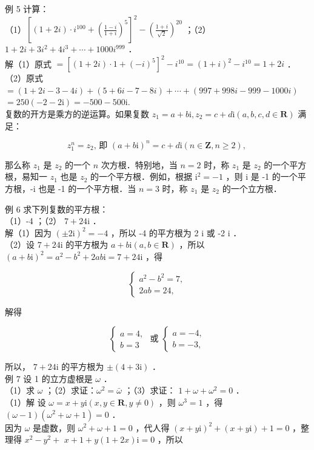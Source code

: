 \documentclass[10pt]{article}
\begin{document}
例 5 计算：\\
（1）\(\left[(1+2 i) \cdot i^{100}+\left(\frac{1-i}{1+i}\right)^{5}\right]^{2}-\left(\frac{1+i}{\sqrt{2}}\right)^{20}\) ；（2） \(1+2 i+3 i^{2}+4 i^{3}+\cdots+1000 i^{999}\) ．\\
解（1）原式 \(=\left[(1+2 i) \cdot 1+(-i)^{5}\right]^{2}-i^{10}=(1+i)^{2}-i^{10}=1+2 i\) ．\\
（2）原式 \(=(1+2 i-3-4 i)+(5+6 i-7-8 i)+\cdots+(997+998 i-999-1000 i)\) \(=250(-2-2 \mathrm{i})=-500-500 \mathrm{i}\).\\
复数的开方是乘方的逆运算。如果复数 \(z_{1}=a+b \mathrm{i}, z_{2}=c+d \mathrm{i}(a, b, c, d \in \mathbf{R})\) 满足：

\[
z_{1}^{n}=z_{2} \text {, 即 }(a+b \mathrm{i})^{n}=c+d \mathrm{i}(n \in \mathbf{Z}, n \geqslant 2) \text {, }
\]

那么称 \(z_{1}\) 是 \(z_{2}\) 的一个 \(n\) 次方根．特别地，当 \(n=2\) 时，称 \(z_{1}\) 是 \(z_{2}\) 的一个平方根，易知一 \(z_{1}\) 也是 \(z_{2}\) 的一个平方根．例如，根据 \(\mathrm{i}^{2}=-1\) ，则 i 是 -1 的一个平方根，-i 也是 -1 的一个平方根．当 \(n=3\) 时，称 \(z_{1}\) 是 \(z_{2}\) 的一个立方根．

例 6 求下列复数的平方根：\\
（1）-4 ；（2） \(7+24 \mathrm{i}\) ．\\
解（1）因为 \(( \pm 2 \mathrm{i})^{2}=-4\) ，所以 -4 的平方根为 2 i 或 -2 i ．\\
（2）设 \(7+24 \mathrm{i}\) 的平方根为 \(a+b \mathrm{i}(a, b \in \mathbf{R})\) ，所以 \((a+b \mathrm{i})^{2}=a^{2}-b^{2}+2 a b \mathrm{i}=7+24 \mathrm{i}\) ，得

\[
\left\{\begin{array}{l}
a^{2}-b^{2}=7, \\
2 a b=24,
\end{array}\right.
\]

解得

\[
\left\{\begin{array} { l } 
{ a = 4 , } \\
{ b = 3 }
\end{array} \text { 或 } \left\{\begin{array}{l}
a=-4, \\
b=-3,
\end{array}\right.\right.
\]

所以， \(7+24 \mathrm{i}\) 的平方根为 \(\pm(4+3 \mathrm{i})\) ．\\
例 7 设 1 的立方虚根是 \(\omega\) ．\\
（1）求 \(\omega\) ；（2）求证：\(\omega^{2}=\bar{\omega}\) ；（3）求证： \(1+\omega+\omega^{2}=0\) ．\\
（1）解 设 \(\omega=x+y \mathrm{i}(x, y \in \mathbf{R}, y \neq 0)\) ，则 \(\omega^{3}=1\) ，得 \((\omega-1)\left(\omega^{2}+\omega+1\right)=0\) ．\\
因为 \(\omega\) 是虚数，则 \(\omega^{2}+\omega+1=0\) ，代人得 \((x+y \mathrm{i})^{2}+(x+y \mathrm{i})+1=0\) ，整理得 \(x^{2}-y^{2}+\) \(x+1+y(1+2 x) \mathrm{i}=0\) ，所以
\end{document}
